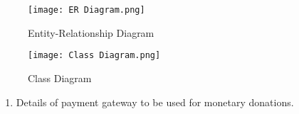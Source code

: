 \documentclass{scrreprt}
\begin{document}
\vspace{1cm}

\begin{figure}[!h]
    \centering
    \texttt{[image: ER Diagram.png]}
    {\caption*{Entity-Relationship Diagram}}
\end{figure}

\begin{figure}[H]
    \centering
    \texttt{[image: Class Diagram.png]}
    {\caption*{Class Diagram}}
\end{figure}


\begin{enumerate}
    \item Details of payment gateway to be used for monetary donations.
\end{enumerate}
\end{document}
